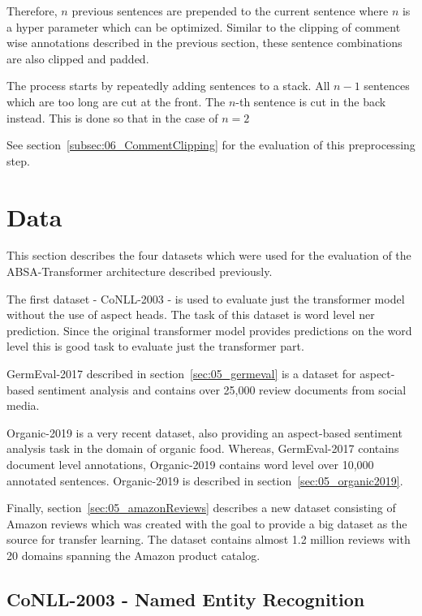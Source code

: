 Therefore, $n$ previous sentences are prepended to the current sentence where $n$ is a hyper parameter which can be optimized. Similar to the clipping of comment wise annotations described in the previous section, these sentence combinations are also clipped and padded. 
\medskip

The process starts by repeatedly adding sentences to a stack. All $n-1$ sentences which are too long are cut at the front. The $n$-th sentence is cut in the back instead. This is done so that in the case of $n=2$ 


See section~\ref{subsec:06_CommentClipping} for the evaluation of this preprocessing step.

\section{Data}
\label{sec:05_Data}

This section describes the four datasets which were used for the evaluation of the ABSA-Transformer architecture described previously.

The first dataset - CoNLL-2003 - is used to evaluate just the transformer model without the use of aspect heads. The task of this dataset is word level \gls{ner} prediction. Since the original transformer model provides predictions on the word level this is good task to evaluate just the transformer part.
\medskip

GermEval-2017 described in section~\ref{sec:05_germeval} is a dataset for aspect-based sentiment analysis and contains over 25,000 review documents from social media.
\medskip

Organic-2019 is a very recent dataset, also providing an aspect-based sentiment analysis task in the domain of organic food. Whereas, GermEval-2017 contains document level annotations, Organic-2019 contains word level over 10,000 annotated sentences. Organic-2019 is described in section~\ref{sec:05_organic2019}.
\medskip

Finally, section~\ref{sec:05_amazonReviews} describes a new dataset consisting of Amazon reviews which was created with the goal to provide a big dataset as the source for transfer learning. The dataset contains almost 1.2 million reviews with 20 domains spanning the Amazon product catalog.

\subsection{CoNLL-2003 - Named Entity Recognition}

